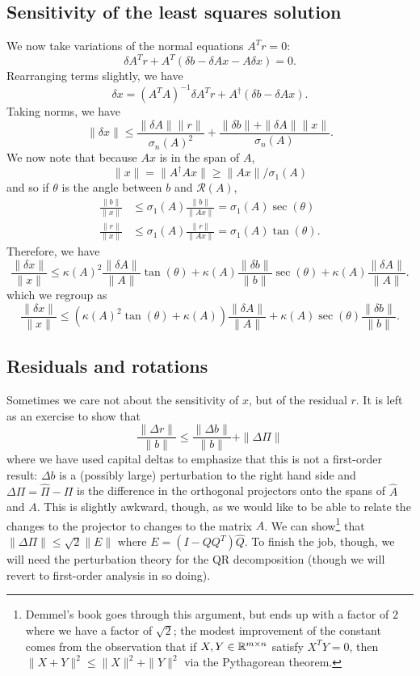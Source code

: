 \documentclass[12pt, leqno]{article} %
\begin{document}
\subsection{Sensitivity of the least squares solution}

We now take variations of the normal equations $A^T r = 0$:
\[
  \delta A^T r + A^T (\delta b - \delta A x - A \delta x) = 0.
\]
Rearranging terms slightly, we have
\[
  \delta x = (A^T A)^{-1} \delta A^T r + A^\dagger (\delta b - \delta A x).
\]
Taking norms, we have
\[
  \|\delta x\| \leq
    \frac{\|\delta A\| \|r\|}{\sigma_n(A)^2} +
    \frac{\|\delta b\| + \|\delta A\| \|x\|}{\sigma_n(A)}.
\]
We now note that because $Ax$ is in the span of $A$,
\[
  \|x\| = \|A^\dagger Ax\| \geq \|Ax\|/\sigma_1(A)
\]
and so if $\theta$ is the angle between $b$ and $\mathcal{R}(A)$,
\begin{align*}
  \frac{\|b\|}{\|x\|} &
    \leq \sigma_1(A) \frac{\|b\|}{\|Ax\|}
    = \sigma_1(A) \sec(\theta) \\
  \frac{\|r\|}{\|x\|} &
    \leq \sigma_1(A) \frac{\|r\|}{\|Ax\|}
    = \sigma_1(A) \tan(\theta).
\end{align*}
Therefore, we have
\[
  \frac{\|\delta x\|}{\|x\|} \leq
    \kappa(A)^2 \frac{\|\delta A\|}{\|A\|} \tan(\theta) +
    \kappa(A) \frac{\|\delta b\|}{\|b\|} \sec(\theta) +
    \kappa(A) \frac{\|\delta A\|}{\|A\|}.
\]
which we regroup as
\[
  \frac{\|\delta x\|}{\|x\|} \leq
    \left( \kappa(A)^2 \tan(\theta) + \kappa(A) \right) \frac{\|\delta A\|}{\|A\|} +
    \kappa(A) \sec(\theta) \frac{\|\delta b\|}{\|b\|}.
\]


\subsection{Residuals and rotations}

Sometimes we care not about the sensitivity of $x$, but of the
residual $r$.  It is left as an exercise to show that
\[
  \frac{\|\Delta r\|}{\|b\|}
  \leq \frac{\|\Delta b\|}{\|b\|} + \|\Delta \Pi\|
\]
where we have used capital deltas to emphasize that this is not
a first-order result:
$\Delta b$ is a (possibly large) perturbation to the right hand side
and $\Delta \Pi = \hat{\Pi}-\Pi$ is the difference in the orthogonal
projectors onto the spans of $\hat{A}$ and $A$.  This is slightly awkward,
though, as we would like to be able to relate the changes to the projector
to changes to the matrix $A$.  We can show\footnote{%
Demmel's book goes through this argument, but ends up with a factor
of $2$ where we have a factor of $\sqrt{2}$; the modest improvement
of the constant comes from the observation that if
$X, Y \in \mathbb{R}^{m \times n}$ satisfy $X^T Y = 0$, then
$\|X+Y\|^2 \leq \|X\|^2 + \|Y\|^2$ via the Pythagorean theorem.
} that
$\|\Delta \Pi\| \leq \sqrt{2} \|E\|$ where
$E = (I-Q Q^T) \hat{Q}$.  To finish the job, though, we will need
the perturbation theory for the
QR decomposition (though we will revert to first-order analysis in
so doing).
\end{document}
